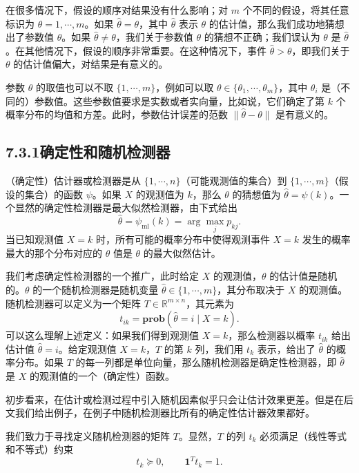 \documentclass[UTF8, 12pt, fontset=fandol, oneside]{ctexart}
\begin{document}
在很多情况下，假设的顺序对结果没有什么影响；对 $m$ 个不同的假设，将其任意标识为 $\theta=1,\cdots,m$。如果 $\hat{\theta}=\theta$，其中 $\hat{\theta}$ 表示 $\theta$ 的估计值，那么我们成功地猜想出了参数值 $\theta$。如果 $\hat{\theta}\neq\theta$，我们关于参数值 $\theta$ 的猜想不正确；我们误认为 $\theta$ 是 $\hat{\theta}$。在其他情况下，假设的顺序非常重要。在这种情况下，事件 $\hat{\theta}>\theta$，即我们关于 $\theta$ 的估计值偏大，对结果是有意义的。

参数 $\theta$ 的取值也可以不取 $\{1,\cdots,m\}$，例如可以取 $\theta\in\{\theta_1,\cdots,\theta_m\}$，其中 $\theta_i$ 是（不同的）参数值。这些参数值要求是实数或者实向量，比如说，它们确定了第 $k$ 个概率分布的均值和方差。此时，参数估计误差的范数 $\|\hat{\theta}-\theta\|$ 是有意义的。

\subsection*{7.3.1\quad 确定性和随机检测器}

（确定性）估计器或检测器是从 $\{1,\cdots,n\}$（可能观测值的集合）到 $\{1,\cdots,m\}$（假设的集合）的函数 $\psi$。如果 $X$ 的观测值为 $k$，那么 $\theta$ 的猜想值为 $\hat{\theta}=\psi(k)$。一个显然的确定性检测器是最大似然检测器，由下式给出
\begin{equation}
\hat{\theta}=\psi_{\mathrm{ml}}(k)=\arg\max_j p_{kj}.
\tag{7.10}
\end{equation}
当已知观测值 $X=k$ 时，所有可能的概率分布中使得观测事件 $X=k$ 发生的概率最大的那个分布对应的 $\theta$ 值是 $\theta$ 的最大似然估计。

我们考虑确定性检测器的一个推广，此时给定 $X$ 的观测值，$\theta$ 的估计值是随机的。$\theta$ 的一个随机检测器是随机变量 $\hat{\theta}\in\{1,\cdots,m\}$，其分布取决于 $X$ 的观测值。随机检测器可以定义为一个矩阵 $T\in\mathbb{R}^{m\times n}$，其元素为
\[
t_{ik}=\mathbf{prob}(\hat{\theta}=i\mid X=k).
\]
可以这么理解上述定义：如果我们得到观测值 $X=k$，那么检测器以概率 $t_{ik}$ 给出估计值 $\hat{\theta}=i$。给定观测值 $X=k$，$T$ 的第 $k$ 列，我们用 $t_k$ 表示，给出了 $\hat{\theta}$ 的概率分布。如果 $T$ 的每一列都是单位向量，那么随机检测器是确定性检测器，即 $\hat{\theta}$ 是 $X$ 的观测值的一个（确定性）函数。

初步看来，在估计或检测过程中引入随机因素似乎只会让估计效果更差。但是在后文我们给出例子，在例子中随机检测器比所有的确定性估计器效果都好。

我们致力于寻找定义随机检测器的矩阵 $T$。显然，$T$ 的列 $t_k$ 必须满足（线性等式和不等式）约束
\begin{equation}
t_k\succeq 0,\qquad \mathbf{1}^Tt_k=1.
\tag{7.11}
\end{equation}
\end{document}
